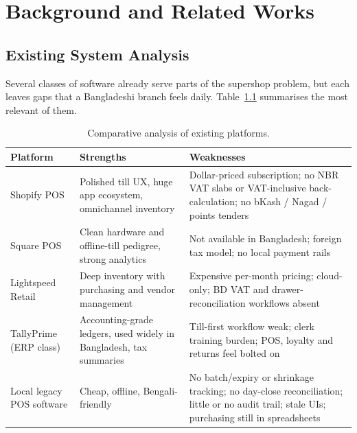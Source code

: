 \documentclass[12pt,a4paper]{report}
\begin{document}
\chapter{Background and Related Works}

\section{Existing System Analysis}
Several classes of software already serve parts of the supershop problem, but each leaves
gaps that a Bangladeshi branch feels daily. Table~\ref{tab:competitors} summarises the
most relevant of them.

\begin{table}[H]
\centering
\caption{Comparative analysis of existing platforms.}
\label{tab:competitors}
\small
\renewcommand{\arraystretch}{1.25}
\begin{tabularx}{\textwidth}{l X X}
\toprule
\textbf{Platform} & \textbf{Strengths} & \textbf{Weaknesses} \\
\midrule
Shopify POS & Polished till UX, huge app ecosystem, omnichannel inventory &
Dollar-priced subscription; no NBR VAT slabs or VAT-inclusive back-calculation; no bKash /
Nagad / points tenders \\
Square POS & Clean hardware and offline-till pedigree, strong analytics &
Not available in Bangladesh; foreign tax model; no local payment rails \\
Lightspeed Retail & Deep inventory with purchasing and vendor management &
Expensive per-month pricing; cloud-only; BD VAT and drawer-reconciliation workflows absent \\
TallyPrime (ERP class) & Accounting-grade ledgers, used widely in Bangladesh,
tax summaries & Till-first workflow weak; clerk training burden; POS, loyalty and returns
feel bolted on \\
Local legacy POS software & Cheap, offline, Bengali-friendly &
No batch/expiry or shrinkage tracking; no day-close reconciliation; little or no audit
trail; stale UIs; purchasing still in spreadsheets \\
\bottomrule
\end{tabularx}
\end{table}
\end{document}
